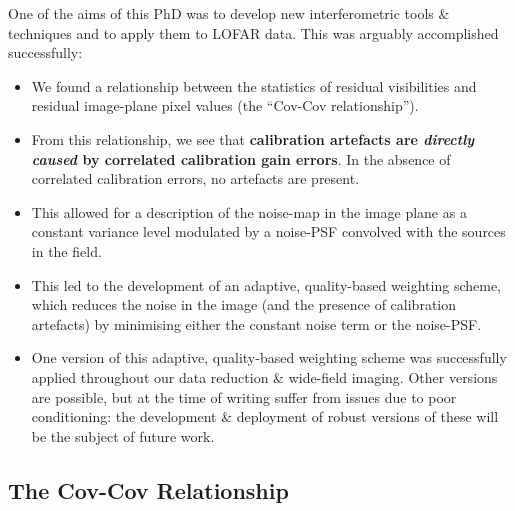 \pg
One of the aims of this PhD was to develop new interferometric tools \& techniques and to apply them to LOFAR data. This was arguably accomplished successfully:
\begin{itemize}
\item We found a relationship between the statistics of residual visibilities and residual image-plane pixel values (the ``Cov-Cov relationship'').
\item From this relationship, we see that \textbf{calibration artefacts are \textit{directly caused} by correlated calibration gain errors}. In the absence of correlated calibration errors, no artefacts are present.
\item This allowed for a description of the noise-map in the image plane as a constant variance level modulated by a noise-PSF convolved with the sources in the field.
\item This led to the development of an adaptive, quality-based weighting scheme, which reduces the noise in the image (and the presence of calibration artefacts) by minimising either the constant noise term or the noise-PSF.
\item One version of this adaptive, quality-based weighting scheme was successfully applied throughout our data reduction \& wide-field imaging. Other versions are possible, but at the time of writing suffer from issues due to poor conditioning: the development \& deployment of robust versions of these will be the subject of future work.
\end{itemize}

\subsection{The Cov-Cov Relationship}

